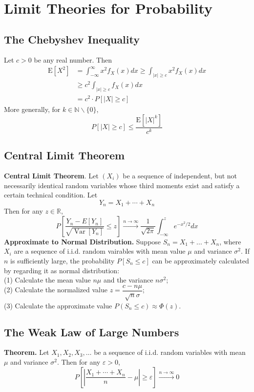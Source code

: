 \documentclass[a4paper,12pt]{article}
\begin{document}
    \section{Limit Theories for Probability}
    \subsection{The Chebyshev Inequality}
    Let $c>0$ be any real number. Then
$$
\begin{aligned}
\mathrm{E}\left[X^2\right] & =\int_{-\infty}^{\infty} x^2 f_X(x) d x \geq \int_{|x| \geq c} x^2 f_X(x) d x \\
& \geq c^2 \int_{|x| \geq c} f_X(x) d x \\
& =c^2 \cdot P[|X| \geq c]
\end{aligned}
$$
More generally, for $k \in \mathbb{N} \backslash\{0\}$,
\begin{equation}
P[|X| \geq c] \leq \frac{\mathrm{E}\left[|X|^k\right]}{c^k}
\end{equation}


\subsection{Central Limit Theorem}
\textbf{Central Limit Theorem}. Let $\left(X_i\right)$ be a sequence of independent, but not necessarily identical random variables whose third moments exist and satisfy a certain technical condition.
Let
$$
Y_n=X_1+\cdots+X_n
$$
Then for any $z \in \mathbb{R}$,
\begin{equation}
P\left[\frac{Y_n-E\left[Y_n\right]}{\sqrt{\operatorname{Var}\left[Y_n\right]}} \leq z\right] \stackrel{n \rightarrow \infty}{\longrightarrow} \frac{1}{\sqrt{2 \pi}} \int_{-\infty}^z e^{-x^2 / 2} d x
\end{equation}
\textbf{Approximate to Normal Distribution.} Suppose $S_n=X_1+...+X_n$, where $X_i$ are a sequence of i.i.d. random vairables with mean value $\mu$ and variance $\sigma^2$. If $n$ is sufficiently large, the probability $P[S_n \leq c]$ can be approximately calculated by regarding it as normal distribution:\\
(1) Calculate the mean value $n\mu$ and the variance $n\sigma^2$;\\
(2) Calculate the normalized value $z=\dfrac{c-n\mu}{\sqrt{n}\sigma}$;\\
(3) Calculate the approximate value $P(S_n\leq c) \approx \Phi(z) $.


\subsection{The Weak Law of Large Numbers}
\textbf{Theorem.} Let $X_1, X_2, X_3, \ldots$ be a sequence of
i.i.d. random variables with mean $\mu$ and variance $\sigma^2$. Then for any $\varepsilon>0$,
\begin{equation}
    P\left[\left|\frac{X_1+\cdots+X_n}{n}-\mu\right| \geq \varepsilon\right] \stackrel{n \rightarrow \infty}{\longrightarrow} 0
\end{equation}
\end{document}
